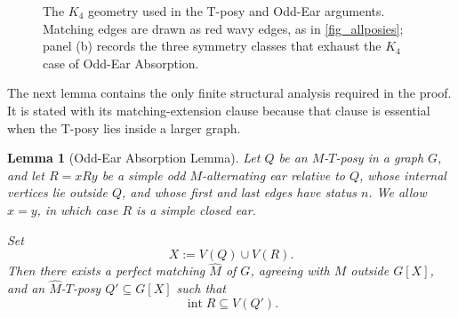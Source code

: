 \documentclass[preprint,12pt]{elsarticle}
\theoremstyle{plain}
\newtheorem{lemma}[theorem]{Lemma}
\begin{document}
\begin{figure}[H]
\begin{subfigure}{0.35\textwidth}
\end{subfigure}
\caption{The $K_4$ geometry used in the T-posy and Odd-Ear arguments.  Matching edges are drawn as red wavy edges, as in \cref{fig_allposies}; panel (b) records the three symmetry classes that exhaust the $K_4$ case of Odd-Ear Absorption.}
\label{fig_k4_tposy}
\end{figure}

The next lemma contains the only finite structural analysis required in the proof.  It is stated
with its matching-extension clause because that clause is essential when the
T-posy lies inside a larger graph.

\begin{lemma}[Odd-Ear Absorption Lemma]
\label{lem_ear_absorption}
Let \(Q\) be an \(M\)-\(T\)-posy in a graph \(G\), and let
\(R=xRy\) be a simple odd \(M\)-alternating ear relative to \(Q\),
whose internal vertices lie outside \(Q\), and whose first and last
edges have status \(n\). We allow \(x=y\), in which case \(R\) is a
simple closed ear.

Set
\[
X:=V(Q)\cup V(R).
\]
Then there exists a perfect matching \(\widehat M\) of \(G\), agreeing
with \(M\) outside \(G[X]\), and an \(\widehat M\)-\(T\)-posy
\(Q'\subseteq G[X]\) such that
\[
\operatorname{int}R\subseteq V(Q').
\]
\end{lemma}
\end{document}
